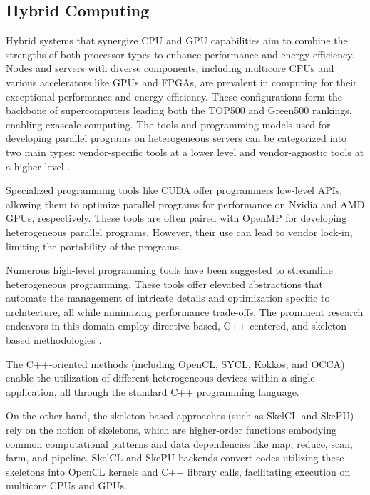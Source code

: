 \documentclass[13pt]{article}
\begin{document}
\subsection{Hybrid Computing}
Hybrid systems that synergize CPU and GPU capabilities aim to combine the strengths of both processor types to enhance performance and energy efficiency. 
Nodes and servers with diverse components, including multicore CPUs and various accelerators like GPUs and FPGAs, are prevalent in computing for their exceptional performance and energy efficiency. These configurations form the backbone of supercomputers leading both the TOP500 \cite{rank1} and Green500 \cite{rank2} rankings, enabling exascale computing. 
The tools and programming models used for developing parallel programs on heterogeneous servers can be categorized into two main types: vendor-specific tools at a lower level and vendor-agnostic tools at a higher level \cite{paper1}. 

Specialized programming tools like CUDA \cite{cuda} offer programmers low-level APIs, allowing them to optimize parallel programs for performance on Nvidia and AMD GPUs, respectively. These tools are often paired with OpenMP for developing heterogeneous parallel programs. However, their use can lead to vendor lock-in, limiting the portability of the programs.

Numerous high-level programming tools have been suggested to streamline heterogeneous programming. These tools offer elevated abstractions that automate the management of intricate details and optimization specific to architecture, all while minimizing performance trade-offs. The prominent research endeavors in this domain employ directive-based, C++-centered, and skeleton-based methodologies \cite{paper1}.

The C++-oriented methods (including OpenCL\cite{opencl}, SYCL\cite{sycl}, Kokkos\cite{kokkos}, and OCCA\cite{occa}) enable the utilization of different heterogeneous devices within a single application, all through the standard C++ programming language.

On the other hand, the skeleton-based approaches (such as SkelCL\cite{spelcl} and SkePU\cite{skepu}) rely on the notion of skeletons, which are higher-order functions embodying common computational patterns and data dependencies like map, reduce, scan, farm, and pipeline. SkelCL and SkePU backends convert codes utilizing these skeletons into OpenCL kernels and C++ library calls, facilitating execution on multicore CPUs and GPUs.
\end{document}
